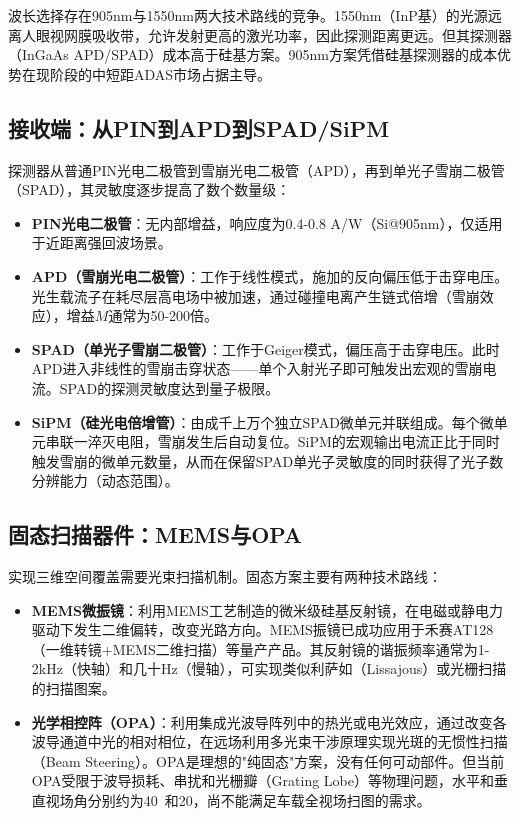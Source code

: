 \documentclass[12pt,a4paper,openany,UTF8]{ctexbook}
\begin{document}
波长选择存在905nm与1550nm两大技术路线的竞争。1550nm（InP基）的光源远离人眼视网膜吸收带，允许发射更高的激光功率，因此探测距离更远。但其探测器（InGaAs APD/SPAD）成本高于硅基方案。905nm方案凭借硅基探测器的成本优势在现阶段的中短距ADAS市场占据主导。

\subsection{接收端：从PIN到APD到SPAD/SiPM}

探测器从普通PIN光电二极管到雪崩光电二极管（APD），再到单光子雪崩二极管（SPAD），其灵敏度逐步提高了数个数量级：

\begin{itemize}
    \item \textbf{PIN光电二极管}：无内部增益，响应度为0.4-0.8 A/W（Si@905nm），仅适用于近距离强回波场景。
    \item \textbf{APD（雪崩光电二极管）}：工作于线性模式，施加的反向偏压低于击穿电压。光生载流子在耗尽层高电场中被加速，通过碰撞电离产生链式倍增（雪崩效应），增益$M$通常为50-200倍。
    \item \textbf{SPAD（单光子雪崩二极管）}：工作于Geiger模式，偏压高于击穿电压。此时APD进入非线性的雪崩击穿状态——单个入射光子即可触发出宏观的雪崩电流。SPAD的探测灵敏度达到量子极限。
    \item \textbf{SiPM（硅光电倍增管）}：由成千上万个独立SPAD微单元并联组成。每个微单元串联一淬灭电阻，雪崩发生后自动复位。SiPM的宏观输出电流正比于同时触发雪崩的微单元数量，从而在保留SPAD单光子灵敏度的同时获得了光子数分辨能力（动态范围）。
\end{itemize}

\subsection{固态扫描器件：MEMS与OPA}

实现三维空间覆盖需要光束扫描机制。固态方案主要有两种技术路线：

\begin{itemize}
    \item \textbf{MEMS微振镜}：利用MEMS工艺制造的微米级硅基反射镜，在电磁或静电力驱动下发生二维偏转，改变光路方向。MEMS振镜已成功应用于禾赛AT128（一维转镜+MEMS二维扫描）等量产产品。其反射镜的谐振频率通常为1-2kHz（快轴）和几十Hz（慢轴），可实现类似利萨如（Lissajous）或光栅扫描的扫描图案。
    \item \textbf{光学相控阵（OPA）}：利用集成光波导阵列中的热光或电光效应，通过改变各波导通道中光的相对相位，在远场利用多光束干涉原理实现光斑的无惯性扫描（Beam Steering）。OPA是理想的"纯固态"方案，没有任何可动部件。但当前OPA受限于波导损耗、串扰和光栅瓣（Grating Lobe）等物理问题，水平和垂直视场角分别约为40\textdegree\ 和20\textdegree，尚不能满足车载全视场扫图的需求。
\end{itemize}
\end{document}
